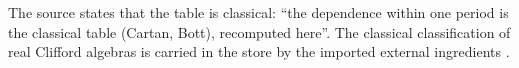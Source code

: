 The source states that the table is classical: ``the dependence within one period is the classical table (Cartan, Bott), recomputed here''. The classical classification of real Clifford algebras is carried in the store by the imported external ingredients .
